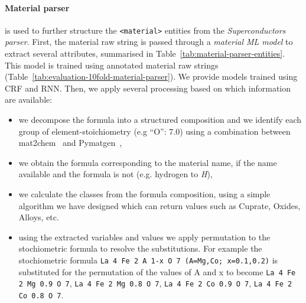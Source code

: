 \documentclass{article}
\begin{document}
\paragraph{Material parser} is used to further structure the \texttt{<material>} entities from the \textit{Superconductors parser}. 
First, the material raw string is passed through a \textit{material ML model} to extract several attributes, summarised in Table~\ref{tab:material-parser-entities}. 
This model is trained using annotated material raw strings (Table~\ref{tab:evaluation-10fold-material-parser}). 
We provide models trained using CRF and RNN.
Then, we apply several processing based on which information are available: 
\begin{itemize}
    \item we decompose the formula into a structured composition and we identify each group of element-stoichiometry (e.g ``O'': 7.0) using a combination between mat2chem~\cite{kononova_text-mined_2019} and Pymatgen~\cite{Ong2013}, 
    \item we obtain the formula corresponding to the material name, if the name available and the formula is not (e.g. hydrogen to \textit{H}), 
    \item we calculate the classes from the formula composition, using a simple algorithm we have designed which can return values such as Cuprate, Oxides, Alloys, etc.
    \item using the extracted variables and values we apply permutation to the stochiometric formula to resolve the substitutions. For example the stochiometric formula \texttt{La 4 Fe 2 A 1-x O 7 (A=Mg,Co; x=0.1,0.2)} is substituted for the permutation of the values of A and x to become \texttt{La 4 Fe 2 Mg 0.9 O 7}, \texttt{La 4 Fe 2 Mg 0.8 O 7}, \texttt{La 4 Fe 2 Co 0.9 O 7}, \texttt{La 4 Fe 2 Co 0.8 O 7}.
\end{itemize}
\end{document}
